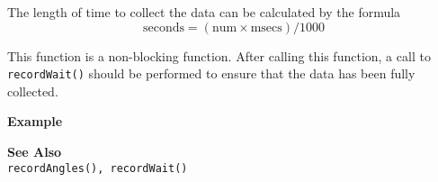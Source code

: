 The length of time to collect the data can be calculated by the formula \\
\begin{equation*}
\text{seconds} = (\text{num} \times \text{msecs}) / 1000
\end{equation*}

This function is a non-blocking function. After calling this function, a call to
\texttt{recordWait()} should be performed to ensure that the data has been fully collected.

\noindent
{\bf Example}\\
\noindent

\noindent
{\bf See Also}\\
\texttt{recordAngles(), recordWait()} \\
